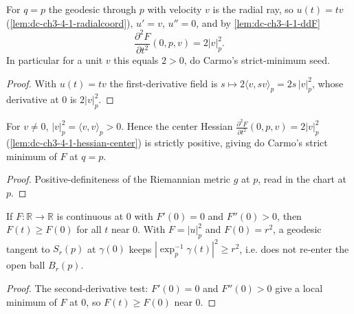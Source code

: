 \begin{lemma}[center Hessian: $\partial^2 F/\partial t^2(0,p,v)=2|v|^2$]
  \label{lem:dc-ch3-4-1-hessian-center}
  \leanok
  For $q=p$ the geodesic through $p$ with velocity $v$ is the radial ray, so
  $u(t)=tv$ (\cref{lem:dc-ch3-4-1-radialcoord}), $u'=v$, $u''=0$, and by
  \cref{lem:dc-ch3-4-1-ddF}
  $$\frac{\partial^2 F}{\partial t^2}(0,p,v)=2|v|_p^2.$$
  In particular for a unit $v$ this equals $2>0$, do Carmo's strict-minimum seed.
\end{lemma}
\begin{proof}
  \leanok
  With $u(t)=tv$ the first-derivative field is
  $s\mapsto 2\langle v,sv\rangle_p=2s\,|v|_p^2$, whose derivative at $0$ is
  $2|v|_p^2$.
\end{proof}

\begin{lemma}
  \label{lem:dc-ch3-4-1-posdef}
  \leanok
  For $v\neq0$, $|v|_p^2=\langle v,v\rangle_p>0$. Hence the center Hessian
  $\frac{\partial^2 F}{\partial t^2}(0,p,v)=2|v|_p^2$
  (\cref{lem:dc-ch3-4-1-hessian-center}) is strictly positive, giving do Carmo's
  strict minimum of $F$ at $q=p$.
\end{lemma}
\begin{proof}
  \leanok
  Positive-definiteness of the Riemannian metric $g$ at $p$, read in the chart
  at $p$.
\end{proof}

\begin{lemma}
  \label{lem:dc-ch3-4-1-outside}
  \leanok
  If $F:\mathbb{R}\to\mathbb{R}$ is continuous at $0$ with $F'(0)=0$ and
  $F''(0)>0$, then $F(t)\ge F(0)$ for all $t$ near $0$. With $F=|u|_p^2$ and
  $F(0)=r^2$, a geodesic tangent to $S_r(p)$ at $\gamma(0)$ keeps
  $|\exp_p^{-1}\gamma(t)|^2\ge r^2$, i.e. does not re-enter the open ball
  $B_r(p)$.
\end{lemma}
\begin{proof}
  \leanok
  The second-derivative test: $F'(0)=0$ and $F''(0)>0$ give a local minimum of
  $F$ at $0$, so $F(t)\ge F(0)$ near $0$.
\end{proof}

